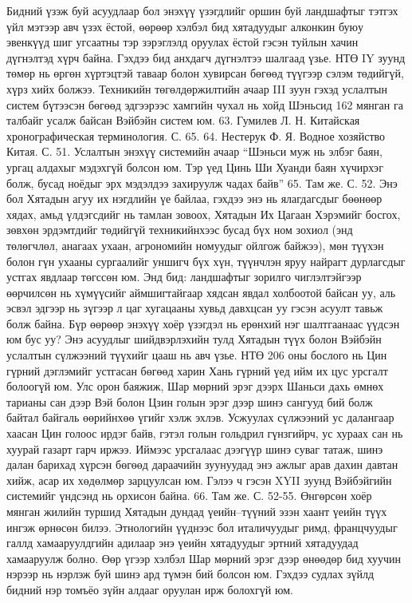 Бидний үзэж буй асуудлаар бол энэхүү үзэгдлийг оршин буй ландшафтыг тэтгэх үйл мэтээр авч үзэх ёстой, өөрөөр хэлбэл бид хятадуудыг алконкин буюу эвенкүүд шиг угсаатны тэр зэрэглэлд оруулах ёстой гэсэн туйлын хачин дүгнэлтэд хүрч байна. Гэхдээ бид анхдагч дүгнэлтээ шалгаад үзье.
НТӨ IY зуунд төмөр нь өргөн хүртэцтэй таваар болон хувирсан бөгөөд түүгээр сэлэм төдийгүй, хүрз хийх болжээ. Техникийн төгөлдөржилтийн ачаар III зуун гэхэд услалтын систем бүтээсэн бөгөөд эдгээрээс хамгийн чухал нь хойд Шэньсид 162 мянган га талбайг усалж байсан Вэйбэйн систем юм. 63. Гумилев Л. Н. Китайская хронографическая терминология. С. 65. 64. Нестерук Ф. Я. Водное хозяйство Китая. С. 51.
Услалтын энэхүү системийн ачаар “Шэньси муж нь элбэг баян, ургац алдахыг мэдэхгүй болсон юм. Тэр үед Цинь Ши Хуанди баян хүчирхэг болж, бусад ноёдыг эрх мэдэлдээ захируулж чадах байв” 65. Там же. С. 52.
Энэ бол Хятадын агуу их нэгдлийн үе байлаа, гэхдээ энэ нь ялагдагсдыг бөөнөөр хядах, амьд үлдэгсдийг нь тамлан зовоох, Хятадын Их Цагаан Хэрэмийг босгох, зөвхөн эрдэмтдийг төдийгүй техникийнхээс бусад бүх ном зохиол (энд төлөгчлөл, анагаах ухаан, агрономийн номуудыг ойлгож байжээ), мөн түүхэн болон гүн ухааны сургаалийг уншигч бүх хүн, түүнчлэн яруу найрагт дурлагсдыг устгах явдлаар төгссөн юм.
Энд бид: ландшафтыг зорилго чиглэлтэйгээр өөрчилсөн нь хүмүүсийг аймшигтайгаар хядсан явдал холбоотой байсан уу, аль эсвэл эдгээр нь зүгээр л цаг хугацааны хувьд давхцсан уу гэсэн асуулт тавьж болж байна. Бүр өөрөөр энэхүү хоёр үзэгдэл нь ерөнхий нэг шалтгаанаас үүдсэн юм бус уу? Энэ асуудлыг шийдвэрлэхийн тулд Хятадын түүх болон Вэйбэйн услалтын сүлжээний түүхийг цааш нь авч үзье.
НТӨ 206 оны бослого нь Цин гүрний дэглэмийг устгасан бөгөөд харин Хань гүрний үед ийм их цус урсгалт болоогүй юм. Улс орон баяжиж, Шар мөрний эрэг дээрх Шаньси дахь өмнөх тарианы сан дээр Вэй болон Цзин голын эрэг дээр шинэ сангууд бий болж байтал байгаль өөрийнхөө үгийг хэлж эхлэв. Усжуулах сүлжээний ус далангаар хаасан Цин голоос ирдэг байв, гэтэл голын гольдрил гүнзгийрч, ус хураах сан нь хуурай газарт гарч иржээ. Иймээс урсгалаас дээгүүр шинэ суваг татаж, шинэ далан барихад хүрсэн бөгөөд дараачийн зуунуудад энэ ажлыг арав дахин давтан хийж, асар их хөдөлмөр зарцуулсан юм. Гэлээ ч гэсэн XYII зуунд Вэйбэйгийн системийг үндсэнд нь орхисон байна. 66. Там же. С. 52-55.
Өнгөрсөн хоёр мянган жилийн туршид Хятадын дундад үеийн–түүний эзэн хаант үеийн түүх ингэж өрнөсөн билээ. Этнологийн үүднээс бол италичуудыг римд, францчуудыг галлд хамааруулдгийн адилаар энэ үеийн хятадуудыг эртний хятадуудад хамааруулж болно. Өөр үгээр хэлбэл Шар мөрний эрэг дээр өнөөдөр бид хуучин нэрээр нь нэрлэж буй шинэ ард түмэн бий болсон юм. Гэхдээ судлах зүйлд бидний нэр томъёо зүйн алдааг оруулан ирж болохгүй юм.
